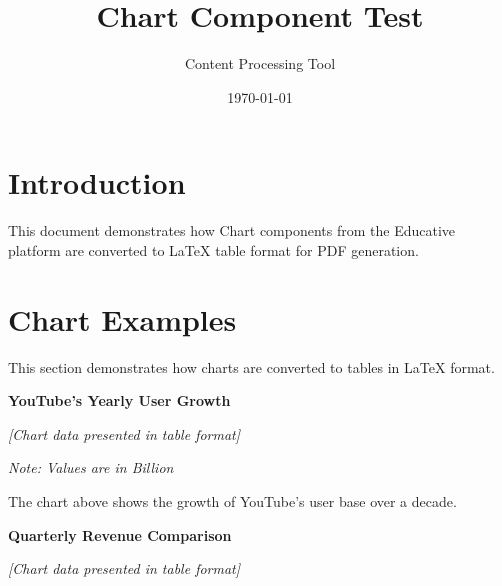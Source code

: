 \documentclass[12pt,a4paper]{article}
\title{Chart Component Test}
\author{Content Processing Tool}
\date{\today}
\begin{document}
\maketitle

\section*{Introduction}

This document demonstrates how Chart components from the Educative platform are converted to LaTeX table format for PDF generation.

\section{Chart Examples}\label{chart-examples}

This section demonstrates how charts are converted to tables in LaTeX format.

\textbf{YouTube's Yearly User Growth}

\textit{\small [Chart data presented in table format]}

\begin{table}[htbp]
\centering
\small
{}
\caption{Increase in monthly active users of YouTube per year}
\label{tab:chart}

\textit{\small Note: Values are in Billion}
\end{table}

The chart above shows the growth of YouTube's user base over a decade.

\textbf{Quarterly Revenue Comparison}

\textit{\small [Chart data presented in table format]}
\end{document}
